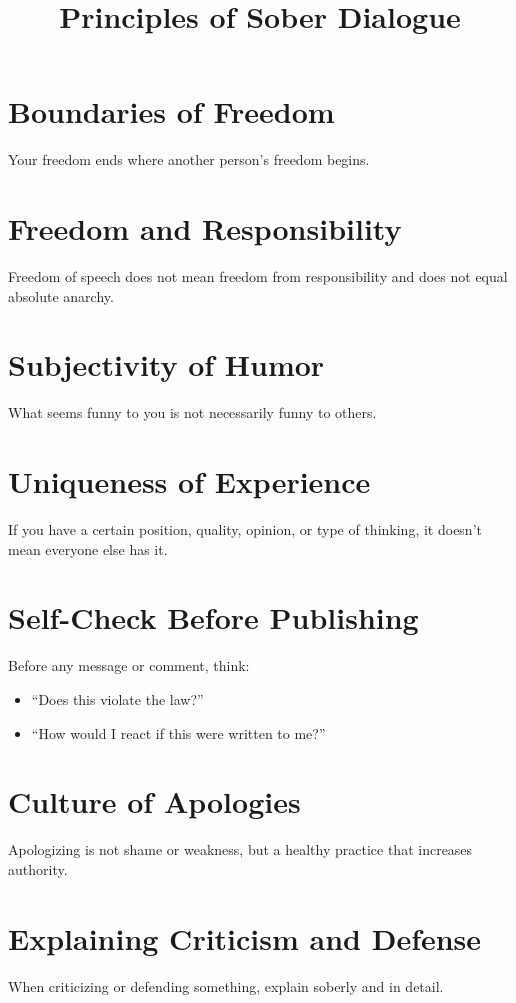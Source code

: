 \documentclass{article}
\title{Principles of Sober Dialogue}
\author{}
\date{}
\begin{document}
\maketitle

\section{Boundaries of Freedom}
Your freedom ends where another person's freedom begins.

\section{Freedom and Responsibility}
Freedom of speech does not mean freedom from responsibility and does not equal absolute anarchy.

\section{Subjectivity of Humor}
What seems funny to you is not necessarily funny to others.

\section{Uniqueness of Experience}
If you have a certain position, quality, opinion, or type of thinking, it doesn't mean everyone else has it.

\section{Self-Check Before Publishing}
Before any message or comment, think:
\begin{itemize}
    \item ``Does this violate the law?''
    \item ``How would I react if this were written to me?''
\end{itemize}

\section{Culture of Apologies}
Apologizing is not shame or weakness, but a healthy practice that increases authority.

\section{Explaining Criticism and Defense}
When criticizing or defending something, explain soberly and in detail.
\end{document}
